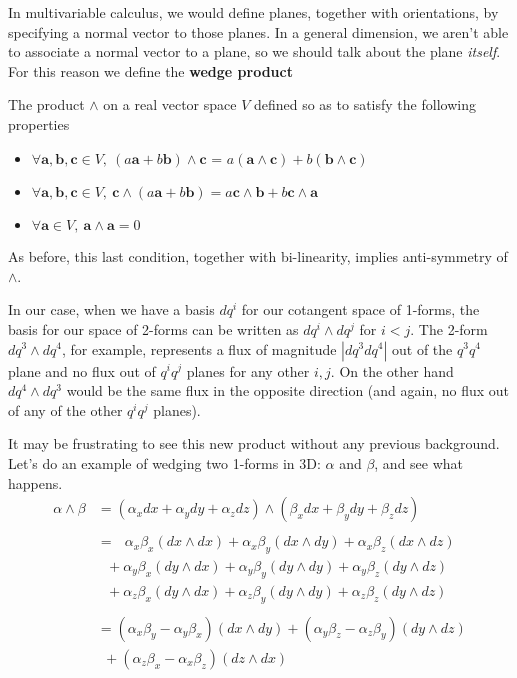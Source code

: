 	
	In multivariable calculus, we would define planes, together with orientations, by specifying a normal vector to those planes. In a general dimension, we aren't able to associate a normal vector to a plane, so we should talk about the plane \emph{itself}. For this reason we define the \textbf{wedge product} 
	
	\begin{defn}\label{def:wedge}
		The product $\wedge$ on a real vector space $V$ defined so as to satisfy the following properties
		\begin{itemize}
			\item $ \forall \mathbf a,\mathbf b, \mathbf c \in V, ~ (a \mathbf a + b \mathbf b) \wedge \mathbf c$ = $ a (\mathbf a \wedge \mathbf c) + b (\mathbf b \wedge \mathbf c)$
			\item $ \forall \mathbf a,\mathbf b, \mathbf c \in V, ~ \mathbf c \wedge (a \mathbf a + b \mathbf b) = a \mathbf c \wedge \mathbf b + b \mathbf c \wedge \mathbf a$
			\item $\forall \mathbf a\in V, ~ \mathbf a \wedge \mathbf a = 0$
		\end{itemize}
	\end{defn}
	As before, this last condition, together with bi-linearity, implies anti-symmetry of $\wedge$.
	
	In our case, when we have a basis $dq^i$ for our cotangent space of 1-forms, the basis for our space of 2-forms can be written as $dq^i \wedge dq^j$ for $i<j$. The 2-form $dq^3 \wedge dq^4$, for example, represents a flux of magnitude $|dq^3 dq^4|$ out of the $q^3q^4$ plane and no flux out of $q^iq^j$ planes for any other $i,j$. On the other hand $dq^4 \wedge dq^3$ would be the same flux in the opposite direction (and again, no flux out of any of the other $q^i q^j$ planes).
	
	It may be frustrating to see this new product without any previous background. Let's do an example of wedging two 1-forms in 3D: $\alpha$ and $\beta$, and see what happens.
	\begin{align*}
		\alpha \wedge \beta &=(\alpha_x dx + \alpha_y dy + \alpha_z dz) \wedge (\beta_x dx + \beta_y dy + \beta_z dz) \\
		\\
		& =  ~~~ \alpha_x \beta_x (dx \wedge dx) + \alpha_x \beta_y (dx \wedge dy) + \alpha _x \beta_z (dx \wedge dz) \\
		 & ~~~ + \alpha_y \beta_x (dy \wedge dx) + \alpha_y \beta_y (dy \wedge dy) + \alpha_y \beta_z (dy \wedge dz) \\
		 & ~~~ + \alpha_z \beta_x (dy \wedge dx) + \alpha_z \beta_y (dy \wedge dy) + \alpha_z \beta_z (dy \wedge dz)\\
		 \\
		&=(\alpha_x \beta_y - \alpha_y \beta_x)(dx \wedge dy)+ (\alpha_y \beta_z - \alpha_z \beta_y)(dy \wedge dz)\\
		&  ~~ +(\alpha_z \beta_x - \alpha_x \beta_z)(dz \wedge dx) 
	\end{align*}
	
